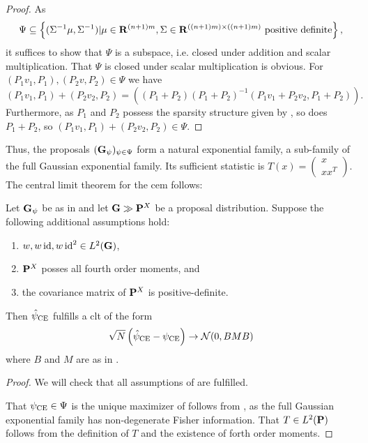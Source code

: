 \begin{proof}
    As 
    $$\Psi \subseteq \left\{(\Sigma ^{-1} \mu, \Sigma^{-1}) | \mu \in \R^{(n+1)m}, \Sigma \in \R^{((n+1)m)\times ((n+1)m)}\text{ positive definite}\right\},$$
    it suffices to show that $\Psi$ is a subspace, i.e. closed under addition and scalar multiplication. That $\Psi$ is closed under scalar multiplication is obvious. For $(P_{1}v_{1}, P_{1}), (P_{2}v, P_{2}) \in \Psi$ we have 
    $$
        (P_1v_{1}, P_{1}) + (P_2v_{2}, P_{2}) = \left( (P_{1} + P_{2}) (P_{1} + P_{2})^{-1} (P_{1}v_{1} + P_{2}v_{2}, P_{1} + P_{2})\right).
    $$
    Furthermore, as $P_{1}$ and $P_{2}$ possess the sparsity structure given by , so does $P_{1} + P_{2}$, so $(P_1v_{1}, P_{1}) + (P_2v_{2}, P_{2}) \in \Psi$.
\end{proof}


Thus, the proposals $(\G_{\psi})_{\psi \in \Psi}$ form a natural exponential family, a sub-family of the full Gaussian exponential family. Its sufficient statistic is $T(x) = \begin{pmatrix}
    x \\ xx^{T}
\end{pmatrix}$. The central limit theorem for the \acrshort{cem} follows:

\begin{theorem}
    \label{thm:cem_clt_ssm}
    Let $\G_{\psi}$ be as in  and let $\G \gg \P^{X}$ be a proposal distribution. Suppose the following additional assumptions hold:
    \begin{enumerate}
        \item $w, w\id, w\id^2 \in L^{2}(\G)$,
        \item $\P^{X}$ posses all fourth order moments, and
        \item the covariance matrix of $\P^{X}$ is positive-definite.
    \end{enumerate}
    
    Then $\hpce$ fulfills a \acrshort{clt} of the form 
    $$
        \sqrt{N} \left(\hpce - \pce \right) \to \mathcal N(0, BMB)
    $$
    where $B$ and $M$ are as in .
\end{theorem}

\begin{proof}
    We will check that all assumptions of  are fulfilled. 

    That $\pce\in\Psi$ is the unique maximizer of  follows from , as the full Gaussian exponential family has non-degenerate Fisher information. That $T \in L^{2} (\P)$ follows from the definition of $T$ and the existence of forth order moments.
\end{proof}

